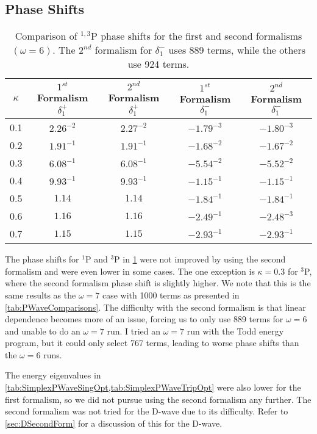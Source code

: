 \documentclass[Dissertation.tex]{subfiles}
\begin{document}
\subsection{Phase Shifts}
\label{sec:PWave2ndPhase}

\begin{table}[H]
\centering
\begin{tabular}{c c c c c}
\toprule
$\kappa$ & $1^{st}$ Formalism $\delta_1^+$ & $2^{nd}$ Formalism $\delta_1^+$ & $1^{st}$ Formalism $\delta_1^-$ & $2^{nd}$ Formalism $\delta_1^-$ \\
\midrule
0.1 & $2.26^{-2}$ & $2.27^{-2}$ & $-1.79^{-3}$ & $-1.80^{-3}$ \\
0.2 & $1.91^{-1}$ & $1.91^{-1}$ & $-1.68^{-2}$ & $-1.67^{-2}$ \\
0.3 & $6.08^{-1}$ & $6.08^{-1}$ & $-5.54^{-2}$ & $-5.52^{-2}$ \\
0.4 & $9.93^{-1}$ & $9.93^{-1}$ & $-1.15^{-1}$ & $-1.15^{-1}$ \\
0.5 & $1.14$      & $1.14$      & $-1.84^{-1}$ & $-1.84^{-1}$ \\
0.6 & $1.16$      & $1.16$      & $-2.49^{-1}$ & $-2.48^{-3}$ \\
0.7 & $1.15$      & $1.15$      & $-2.93^{-1}$ & $-2.93^{-1}$ \\
\bottomrule
\end{tabular}
\caption[Comparison of $^{1,3}$P phase shifts for the first and second formalisms]{Comparison of $^{1,3}$P phase shifts for the first and second formalisms $(\omega = 6)$. The $2^{nd}$ formalism for $\delta_1^-$ uses 889 terms, while the others use 924 terms.}
\label{tab:PWaveFormalPhase}
\end{table}

The phase shifts for $^1$P and $^3$P in \cref{tab:PWaveFormalPhase} were not 
improved by using the second formalism and were even lower in some cases. The 
one exception is $\kappa = 0.3$ for $^3$P, where the second formalism phase shift
is slightly higher. We note that this is the same results as the $\omega = 7$
case with 1000 terms as presented in \cref{tab:PWaveComparisons}.
The difficulty with the second formalism is that linear dependence becomes more
of an issue, forcing us to only use 889 terms for $\omega = 6$ and unable to
do an $\omega = 7$ run. I tried an $\omega = 7$ run with the Todd energy
program, but it could only select 767 terms, leading to worse phase shifts than
the $\omega = 6$ runs.

The energy eigenvalues in \cref{tab:SimplexPWaveSingOpt,tab:SimplexPWaveTripOpt}
were also lower for the first formalism, so we did not pursue using the second
formalism any further. The second formalism was not tried for the D-wave due to
its difficulty. Refer to \cref{sec:DSecondForm} for a discussion of this for
the D-wave.
\end{document}
